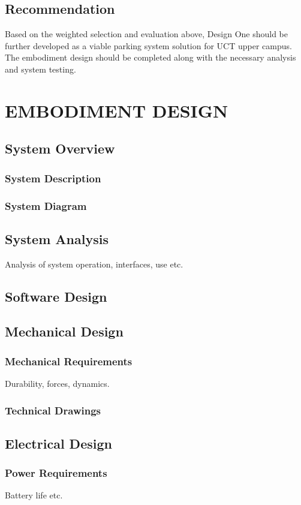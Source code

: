 \subsection{Recommendation}
Based on the weighted selection and evaluation above, Design One should be further developed as a viable parking system solution for UCT upper campus. The embodiment design should be completed along with the necessary analysis and system testing.

\newpage
\section{EMBODIMENT DESIGN}
\subsection{System Overview}
\subsubsection{System Description}
\subsubsection{System Diagram}
\subsection{System Analysis}
Analysis of system operation, interfaces, use etc.
\subsection{Software Design}
\subsection{Mechanical Design} 
\subsubsection{Mechanical Requirements}
Durability, forces, dynamics.
\subsubsection{Technical Drawings}
\subsection{Electrical Design} 
\subsubsection{Power Requirements}
Battery life etc.

